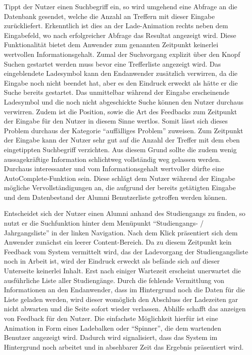 {
	Tippt der Nutzer einen Suchbegriff ein, so wird umgehend eine Abfrage an die Datenbank gesendet, welche die Anzahl an Treffern mit dieser Eingabe zurückliefert. Erkenntlich ist dies an der Lade-Animation rechts neben dem Eingabefeld, wo nach erfolgreicher Abfrage das Resultat angezeigt wird. Diese Funktionalität bietet dem Anwender zum genannten Zeitpunkt keinerlei wertvollen Informationsgehalt. Zumal der Suchvorgang explizit über den Knopf Suchen gestartet werden muss bevor eine Trefferliste angezeigt wird. Das eingeblendete Ladesymbol kann den Endanwender zusätzlich verwirren, da die Eingabe noch nicht beendet hat, aber es den Eindruck erweckt als hätte er die Suche bereits gestartet.
}
{
	Das unmittelbar während der Eingabe erscheinende Ladesymbol und die noch nicht abgeschickte Suche können den Nutzer durchaus verwirren. Zudem ist die Position, sowie die Art des Feedbacks zum Zeitpunkt der Eingabe für den Nutzer in diesem Sinne wertlos. Somit lässt sich dieses Problem durchaus der Kategorie “auffälliges Problem” zuweisen.
}
{
	Zum Zeitpunkt der Eingabe kann der Nutzer sehr gut auf die Anzahl der Treffer mit dem eben eingetippten Suchbegriff verzichten. Aus diesem Grund sollte die zudem wenig aussagekräftige Information schlichtweg vollständig weg gelassen werden. Durchaus interessanter und vom Informationsgehalt wertvoller dürfte eine AutoComplete-Funktion sein. Diese schlägt dem Nutzer während der Eingabe mögliche Vervollständigungen an, die aufgrund der bereits getätigten Eingabe und dem Datenbestand der Alumni Benutzerliste getroffen werden können.
} 

{
	Entscheidet sich der Nutzer einen Alumni anhand des Studiengangs zu finden, so nutzt er die Suchfunktion hinter dem Menüpunkt “Studiengangs- / Jahrgangsliste” in der linken Navigation. Nach dem Klick präsentiert sich dem Anwender zunächst ein leerer Content-Bereich. Da zu diesem Zeitpunkt kein Feedback vom System vermittelt wird, das der Ladevorgang der Studiengangsliste noch in Arbeit ist, wird der Eindruck erweckt als befände sich auf dieser Unterseite keinerlei Inhalt. Erst nach einiger Wartezeit erscheint unerwartet die ausführliche Liste aller Studiengänge.
}
{
	Durch die fehlende Vermittlung von Informationen an den Endanwender, dass im Hintergrund noch die Daten für die Liste geladen werden, wird dieser womöglich den Abschluss der Ladezeiten gar nicht abwarten und die Seite sofort wieder verlassen. 
}
{
	Abhilfe schafft das anzeigen von Feedback für den Nutzer. Die einfachste Möglichkeit hierfür ist eine Animation in Form eines Ladebalken oder “Spinner”, die dem wartenden Benutzer angezeigt wird. Dadurch wird signalisiert, dass das System im Hintergrund noch arbeitet und in absehbarer Zeit das Ergebnis präsentiert wird.
} 

